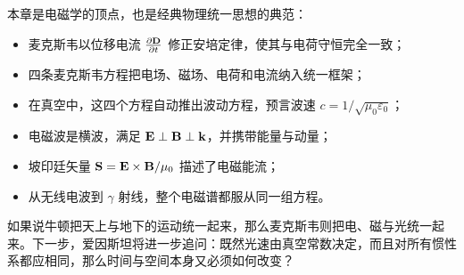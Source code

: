 本章是电磁学的顶点，也是经典物理统一思想的典范：
\begin{itemize}
  \item 麦克斯韦以位移电流 $\pdv{\vb{D}}{t}$ 修正安培定律，使其与电荷守恒完全一致；
  \item 四条麦克斯韦方程把电场、磁场、电荷和电流纳入统一框架；
  \item 在真空中，这四个方程自动推出波动方程，预言波速 $c=1/\sqrt{\mu_0\varepsilon_0}$；
  \item 电磁波是横波，满足 $\vb{E}\perp \vb{B}\perp \vb{k}$，并携带能量与动量；
  \item 坡印廷矢量 $\vb{S}=\vb{E}\times\vb{B}/\mu_0$ 描述了电磁能流；
  \item 从无线电波到 $\gamma$ 射线，整个电磁谱都服从同一组方程。
\end{itemize}

如果说牛顿把天上与地下的运动统一起来，那么麦克斯韦则把电、磁与光统一起来。下一步，爱因斯坦将进一步追问：既然光速由真空常数决定，而且对所有惯性系都应相同，那么时间与空间本身又必须如何改变？

